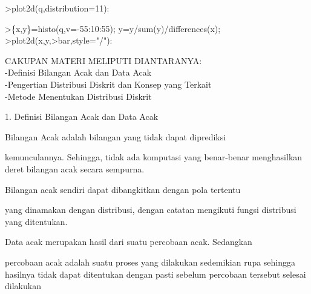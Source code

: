 \documentclass[a4paper,10pt]{article}
\begin{document}
\begin{eulernotebook}
\begin{eulercomment}
\begin{eulercomment}
\begin{eulercomment}
\begin{eulercomment}
\begin{eulercomment}
\begin{eulercomment}
\begin{euleroutput}
  [613,  814,  1088,  1404,  1904,  2389,  1431,  1109,  841,  680]
\end{euleroutput}
\begin{eulerprompt}
>plot2d(q,distribution=11):
\end{eulerprompt}
\begin{eulerprompt}
>\{x,y\}=histo(q,v=-55:10:55); y=y/sum(y)/differences(x);
>plot2d(x,y,>bar,style="/"):
\end{eulerprompt}
\begin{eulercomment}
\begin{eulercomment}
\begin{eulercomment}
CAKUPAN MATERI MELIPUTI DIANTARANYA:\\
-Definisi Bilangan Acak dan Data Acak\\
-Pengertian Distribusi Diskrit dan Konsep yang Terkait\\
-Metode Menentukan Distribusi Diskrit


1. Definisi Bilangan Acak dan Data Acak

\end{eulercomment}
\begin{eulerttcomment}
      Bilangan Acak adalah bilangan yang tidak dapat diprediksi
\end{eulerttcomment}
\begin{eulercomment}
kemunculannya. Sehingga, tidak ada komputasi yang benar-benar
menghasilkan deret bilangan acak secara sempurna.\\
\end{eulercomment}
\begin{eulerttcomment}
      Bilangan acak sendiri dapat dibangkitkan dengan pola tertentu
\end{eulerttcomment}
\begin{eulercomment}
yang dinamakan dengan distribusi, dengan catatan mengikuti fungsi
distribusi yang ditentukan.\\
\end{eulercomment}
\begin{eulerttcomment}
      Data acak merupakan hasil dari suatu percobaan acak. Sedangkan
\end{eulerttcomment}
\begin{eulercomment}
percobaan acak adalah suatu proses yang dilakukan sedemikian rupa
sehingga hasilnya tidak dapat ditentukan dengan pasti sebelum
percobaan tersebut selesai dilakukan


\end{eulercomment}
\end{eulercomment}
\end{eulercomment}
\end{eulercomment}
\end{eulercomment}
\end{eulercomment}
\end{eulercomment}
\end{eulercomment}
\end{eulercomment}
\end{eulernotebook}
\end{document}
